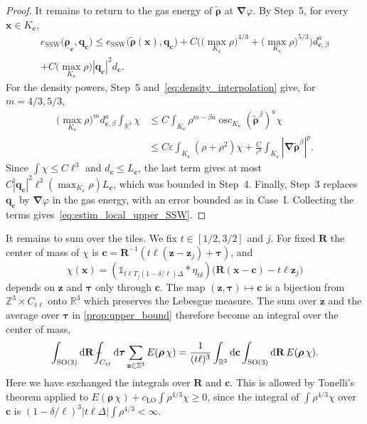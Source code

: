 \documentclass[final,reqno]{amsart}
\theoremstyle{remark}
\renewcommand{\le}{\leqslant}
\renewcommand{\ge}{\geqslant}
\renewcommand{\epsilon}{\varepsilon}
\newcommand{\ul}[1]{\underline{#1}}
\newcommand{\wt}[1]{\widetilde{#1}}
\newcommand{\RR}{\mathbb{R}}
\newcommand{\ZZ}{\mathbb{Z}}
\newcommand{\SO}{\mathrm{SO}}
\newcommand{\LO}{\mathrm{LO}}
\newcommand{\SSW}{\mathrm{SSW}}
\newcommand{\iden}{\mathbb{1}}
\newcommand{\grad}{\bm{\nabla}}
\newcommand{\tetra}{\mathbb{\Delta}}
\newcommand{\dd}{\mathrm{d}}
\def\Xint#1{\mathchoice
{\XXint\displaystyle\textstyle{#1}}
{\XXint\textstyle\scriptstyle{#1}}
{\XXint\scriptstyle\scriptscriptstyle{#1}}
{\XXint\scriptscriptstyle\scriptscriptstyle{#1}}
\!\int}
\def\XXint#1#2#3{{\setbox0=\hbox{$#1{#2#3}{\int}$ }
\vcenter{\hbox{$#2#3$ }}\kern-.6\wd0}}
\def\dashint{\Xint-}
\begin{document}
\begin{proof}
It remains to return to the gas energy of $\wt{\bm{\rho}}$ at $\grad\varphi$. By Step~5, for every $\mathbf{x}\in K_{\mathbf{c}}$,
\begin{multline*}
e_\SSW\big(\ul{\bm{\rho}}_{\mathbf{c}},\mathbf{q}_{\mathbf{c}}\big)\le e_\SSW\big(\wt{\bm{\rho}}(\mathbf{x}),\mathbf{q}_{\mathbf{c}}\big)+C\Big(\big(\max_{K_{\mathbf{c}}}\rho\big)^{4/3}+\big(\max_{K_{\mathbf{c}}}\rho\big)^{5/3}\Big)d_{\mathbf{c},\beta}^a\\
+C\Big(\max_{K_{\mathbf{c}}}\rho\Big)|\mathbf{q}_{\mathbf{c}}|^2d_{\mathbf{c}}.
\end{multline*}
For the density powers, Step~5 and~\cref{eq:density_interpolation} give, for $m=4/3,5/3$,
\begin{align*}
\Big(\max_{K_{\mathbf{c}}}\rho\Big)^m d_{\mathbf{c},\beta}^a\int_{\RR^3}\chi
&\le C\int_{K_{\mathbf{c}}}\rho^{m-\beta a}\operatorname{osc}_{K_{\mathbf{c}}}(\wt{\bm{\rho}}^\beta)^a\chi\\
&\le C\epsilon\int_{K_{\mathbf{c}}}(\rho+\rho^2)\chi+\frac{C}{\epsilon^b}\int_{K_{\mathbf{c}}}|\grad\wt{\bm{\rho}}^\beta|^p.
\end{align*}
Since $\int\chi\le C\ell^3$ and $d_{\mathbf{c}}\le L_{\mathbf{c}}$, the last term gives at most $C|\mathbf{q}_{\mathbf{c}}|^2\ell^3(\max_{K_{\mathbf{c}}}\rho)L_{\mathbf{c}}$, which was bounded in Step~4. Finally, Step~3 replaces $\mathbf{q}_{\mathbf{c}}$ by $\grad\varphi$ in the gas energy, with an error bounded as in Case~I. Collecting the terms gives~\cref{eq:estim_local_upper_SSW}.
\end{proof}

It remains to sum over the tiles. We fix $t\in[1/2,3/2]$ and $j$. For fixed $\mathbf{R}$ the center of mass of $\chi$ is $\mathbf{c}=\mathbf{R}^{-1}(t\ell(\mathbf{z}-\mathbf{z}_j)+\bm{\tau})$, and
$$
\chi(\mathbf{x})=(\iden_{t\ell T_j(1-\delta/\ell)\tetra}\ast\eta_{t\delta})\big(\mathbf{R}(\mathbf{x}-\mathbf{c})-t\ell\mathbf{z}_j\big)
$$
depends on $\mathbf{z}$ and $\bm{\tau}$ only through $\mathbf{c}$. The map $(\mathbf{z},\bm{\tau})\mapsto\mathbf{c}$ is a bijection from $\ZZ^3\times C_{t\ell}$ onto $\RR^3$ which preserves the Lebesgue measure. The sum over $\mathbf{z}$ and the average over $\bm{\tau}$ in \cref{prop:upper_bound} therefore become an integral over the center of mass,
$$
\int_{\SO(3)}\dd\mathbf{R}\,\dashint_{C_{t\ell}}\dd\bm{\tau}\sum_{\mathbf{z}\in\ZZ^3}E(\bm{\rho}\,\chi)
=\frac{1}{(t\ell)^3}\int_{\RR^3}\dd\mathbf{c}\int_{\SO(3)}\dd\mathbf{R}\,E(\bm{\rho}\,\chi).
$$
Here we have exchanged the integrals over $\mathbf{R}$ and $\mathbf{c}$. This is allowed by Tonelli's theorem applied to $E(\bm{\rho}\,\chi)+c_\LO\int\rho^{4/3}\chi\ge0$, since the integral of $\int\rho^{4/3}\chi$ over $\mathbf{c}$ is $(1-\delta/\ell)^3|t\ell\tetra|\int\rho^{4/3}<\infty$.
\end{document}

